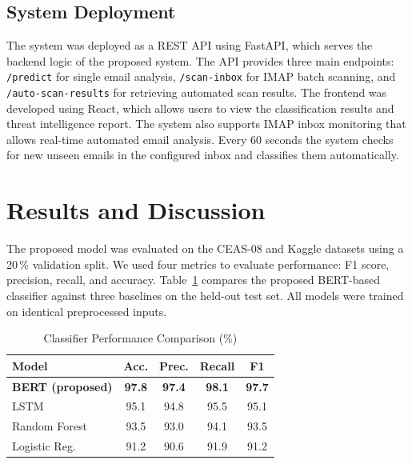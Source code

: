 \documentclass[conference]{IEEEtran}
\begin{document}
\subsection{System Deployment}

The system was deployed as a REST API using FastAPI, which serves
the backend logic of the proposed system. The API provides three
main endpoints: \texttt{/predict} for single email analysis,
\texttt{/scan-inbox} for IMAP batch scanning, and
\texttt{/auto-scan-results} for retrieving automated scan results.
The frontend was developed using React, which allows users to view
the classification results and threat intelligence report. The
system also supports IMAP inbox monitoring that allows real-time
automated email analysis. Every 60 seconds the system checks for
new unseen emails in the configured inbox and classifies them
automatically.

\section{Results and Discussion}
\label{sec:results}

The proposed model was evaluated on the CEAS-08 and Kaggle
datasets using a 20\,\% validation split. We used four metrics to
evaluate performance: F1 score, precision, recall, and accuracy.
Table~\ref{tab:results} compares the proposed BERT-based
classifier against three baselines on the held-out test set. All
models were trained on identical preprocessed inputs.

\begin{table}[t]
  \caption{Classifier Performance Comparison (\%)}
  \label{tab:results}
  \centering
  \begin{tabular}{lcccc}
    \toprule
    \textbf{Model} & \textbf{Acc.} & \textbf{Prec.} &
    \textbf{Recall} & \textbf{F1} \\
    \midrule
    \textbf{BERT (proposed)} & \textbf{97.8} & \textbf{97.4}
      & \textbf{98.1} & \textbf{97.7} \\
    LSTM          & 95.1 & 94.8 & 95.5 & 95.1 \\
    Random Forest & 93.5 & 93.0 & 94.1 & 93.5 \\
    Logistic Reg. & 91.2 & 90.6 & 91.9 & 91.2 \\
    \bottomrule
  \end{tabular}
\end{table}
\end{document}

